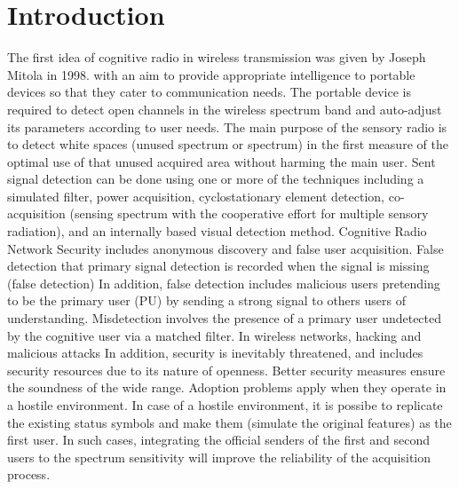 \documentclass{article}
\begin{document}
\section{Introduction}
The first idea of cognitive radio in wireless transmission
was given by Joseph Mitola in 1998. with an aim to provide
appropriate intelligence to portable devices so that they
cater to communication needs. The portable device is
required to detect open channels in the wireless spectrum
band and auto-adjust its parameters according to user
needs.
The main purpose of the sensory radio is to detect white
spaces (unused spectrum or spectrum) in the first measure
of the optimal use of that unused acquired area without
harming the main user. Sent signal detection can be done
using one or more of the techniques including a simulated
filter, power acquisition, cyclostationary element detection,
co-acquisition (sensing spectrum with the cooperative effort
for multiple sensory radiation), and an internally based
visual detection method.
Cognitive Radio Network Security includes anonymous
discovery and false user acquisition. False detection that
primary signal detection is recorded when the signal is
missing (false detection) In addition, false detection
includes malicious users pretending to be the primary user
(PU) by sending a strong signal to others users of
understanding. Misdetection involves the presence of a
primary user undetected by the cognitive user via a matched
filter.
In wireless networks, hacking and malicious attacks In
addition, security is inevitably threatened, and includes
security resources due to its nature of openness. Better
security measures ensure the soundness of the wide range.
Adoption problems apply when they operate in a hostile
environment. In case of a hostile environment, it is possibe to replicate the existing status symbols and make them
(simulate the original features) as the first user. In such
cases, integrating the official senders of the first and second
users to the spectrum sensitivity will improve the reliability
of the acquisition process.
\end{document}
